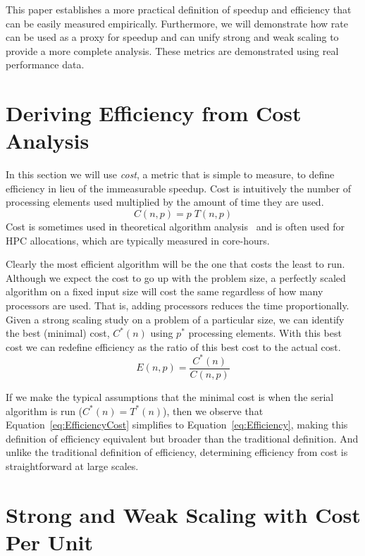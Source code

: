 \documentclass[conference]{IEEEtran}
\newcommand*{\lcite}[1]{~\cite{#1}}
\newcommand*{\keyterm}[1]{\emph{#1}}
\begin{document}
This paper establishes a more practical definition of speedup and
efficiency that can be easily measured empirically. Furthermore, we will
demonstrate how rate can be used as a proxy for speedup and can unify
strong and weak scaling to provide a more complete analysis. These metrics
are demonstrated using real performance data.


\section{Deriving Efficiency from Cost Analysis}
\label{sec:CostAnalysis}

\noindent
In this section we will use \keyterm{cost}, a metric that is simple to
measure, to define efficiency in lieu of the immeasurable speedup. Cost is
intuitively the number of processing elements used multiplied by the amount
of time they are used.
\begin{equation}
  C(n,p) = p \; T(n,p)
  \label{eq:Cost}
\end{equation}
Cost is sometimes used in theoretical algorithm analysis\lcite{JaJa1992}
and is often used for HPC allocations, which are typically measured in
core-hours.

Clearly the most efficient algorithm will be the one that costs the least
to run. Although we expect the cost to go up with the problem size, a
perfectly scaled algorithm on a fixed input size will cost the same
regardless of how many processors are used. That is, adding processors
reduces the time proportionally. Given a strong scaling study on a problem
of a particular size, we can identify the best (minimal) cost, $C^*(n)$
using $p^*$ processing elements. With this best cost we can redefine
efficiency as the ratio of this best cost to the actual cost.
\begin{equation}
  E(n,p) = \frac{C^*(n)}{C(n,p)}
  \label{eq:EfficiencyCost}
\end{equation}

If we make the typical assumptions that the minimal cost is when the serial
algorithm is run ($C^*(n) = T^*(n)$), then we observe that
Equation~\ref{eq:EfficiencyCost} simplifies to
Equation~\ref{eq:Efficiency}, making this definition of efficiency
equivalent but broader than the traditional definition. And unlike the
traditional definition of efficiency, determining efficiency from cost is
straightforward at large scales.


\section{Strong and Weak Scaling with Cost Per Unit}
\label{sec:CostPerUnit}
\end{document}
